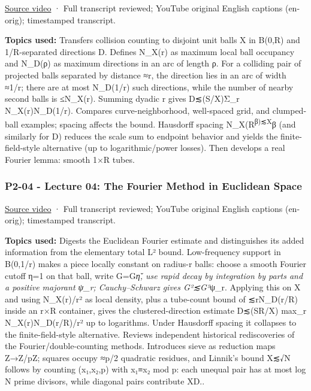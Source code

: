 \href{https://www.youtube.com/watch?v=OAI8C20E7R4}{Source video} · Full transcript reviewed; YouTube original English captions (en-orig); timestamped transcript.

\textbf{Topics used:} Transfers collision counting to disjoint unit balls X in B(0,R) and 1/R-separated directions D. Defines N\_X(r) as maximum local ball occupancy and N\_D(ρ) as maximum directions in an arc of length ρ. For a colliding pair of projected balls separated by distance ≈r, the direction lies in an arc of width ≈1/r; there are at most N\_D(1/r) such directions, while the number of nearby second balls is ≤N\_X(r). Summing dyadic r gives \textbar D\textbar≲(S/\textbar X\textbar)Σ\_r N\_X(r)N\_D(1/r). Compares curve-neighborhood, well-spaced grid, and clumped-ball examples; spacing affects the bound. Hausdorff spacing N\_X(R\textsuperscript{β)≲\textbar X\textbar{}}β (and similarly for D) reduces the scale sum to endpoint behavior and yields the finite-field-style alternative (up to logarithmic/power losses). Then develops a real Fourier lemma: smooth 1×R tubes.

\subsubsection{P2-04 - Lecture 04: The Fourier Method in Euclidean Space}\label{04-visual-computing-ii-ch036-p2-04---lecture-04-the-fourier-method-in-euclidean-space}

\hypertarget{04-visual-computing-ii-ch036-p2-04---lecture-04-the-fourier-method-in-euclidean-space}{}

\href{https://www.youtube.com/watch?v=X-4how4KkPQ}{Source video} · Full transcript reviewed; YouTube original English captions (en-orig); timestamped transcript.

\textbf{Topics used:} Digests the Euclidean Fourier estimate and distinguishes its added information from the elementary total L² bound. Low-frequency support in B(0,1/r) makes a piece locally constant on radius-r balls: choose a smooth Fourier cutoff η=1 on that ball, write G=G\emph{η̌, use rapid decay by integration by parts and a positive majorant ψ\_r; Cauchy--Schwarz gives \textbar G\textbar²≲\textbar G\textbar²}ψ\_r. Applying this on X and using N\_X(r)/r² as local density, plus a tube-count bound of ≲rN\_D(r/R) inside an r×R container, gives the clustered-direction estimate \textbar D\textbar≲(SR/\textbar X\textbar) max\_r N\_X(r)N\_D(r/R)/r² up to logarithms. Under Hausdorff spacing it collapses to the finite-field-style alternative. Reviews independent historical rediscoveries of the Fourier/double-counting methods. Introduces sieve as reduction maps Z→Z/pZ; squares occupy ≈p/2 quadratic residues, and Linnik's bound \textbar X\textbar≲√N follows by counting (x₁,x₂,p) with x₁≡x₂ mod p: each unequal pair has at most log N prime divisors, while diagonal pairs contribute \textbar X\textbar\textbar D\textbar..

